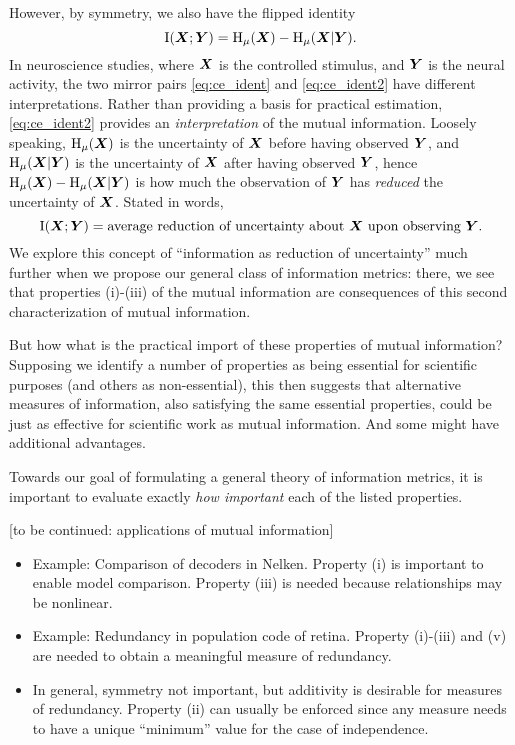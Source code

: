 \documentclass[12pt]{article}
\begin{document}
However, by symmetry, we also have the flipped identity
\begin{equation}\label{eq:ce_ident2}
\text{I}(\boldsymbol{X}; \boldsymbol{Y}) = \text{H}_\mu(\boldsymbol{X}) - \text{H}_\mu(\boldsymbol{X}|\boldsymbol{Y}).
\end{equation}
In neuroscience studies, where $\boldsymbol{X}$ is the controlled stimulus, and
$\boldsymbol{Y}$ is the neural activity, the two mirror pairs \eqref{eq:ce_ident}
and \eqref{eq:ce_ident2} have different interpretations.  Rather than
providing a basis for practical estimation, \eqref{eq:ce_ident2}
provides an \emph{interpretation} of the mutual information.  Loosely
speaking, $\text{H}_\mu(\boldsymbol{X})$ is the uncertainty of $\boldsymbol{X}$ before
having observed $\boldsymbol{Y}$, and $\text{H}_\mu(\boldsymbol{X}|\boldsymbol{Y})$ is the uncertainty
of $\boldsymbol{X}$ after having observed $\boldsymbol{Y}$, hence $\text{H}_\mu(\boldsymbol{X})
- \text{H}_\mu(\boldsymbol{X}|\boldsymbol{Y})$ is how much the observation of $\boldsymbol{Y}$
has \emph{reduced} the uncertainty of $\boldsymbol{X}$.  Stated in words,
\[
\text{I}(\boldsymbol{X}; \boldsymbol{Y}) = \text{average reduction of uncertainty about $\boldsymbol{X}$ upon observing $\boldsymbol{Y}$}.
\]
We explore this concept of ``information as reduction of uncertainty''
much further when we propose our general class of information metrics:
there, we see that properties (i)-(iii) of the mutual information are
consequences of this second characterization of mutual information.

But how what is the practical import of these properties of mutual
information?  Supposing we identify a number of properties as being
essential for scientific purposes (and others as non-essential), this
then suggests that alternative measures of information, also
satisfying the same essential properties, could be just as effective
for scientific work as mutual information.  And some might have
additional advantages.

Towards our goal of formulating a general theory of information
metrics, it is important to evaluate exactly \emph{how important} each
of the listed properties.

[to be continued: applications of mutual information]

\begin{itemize}
\item Example: Comparison of decoders in Nelken.  
Property (i) is important to enable model comparison.  Property (iii)
is needed because relationships may be nonlinear.
\item Example: Redundancy in population code of retina.  
Property (i)-(iii) and (v) are needed to obtain a meaningful measure
of redundancy.
\item In general, symmetry not important, but additivity is desirable 
for measures of redundancy.  Property (ii) can usually be enforced
since any measure needs to have a unique ``minimum'' value for the
case of independence.
\end{itemize}
\end{document}
